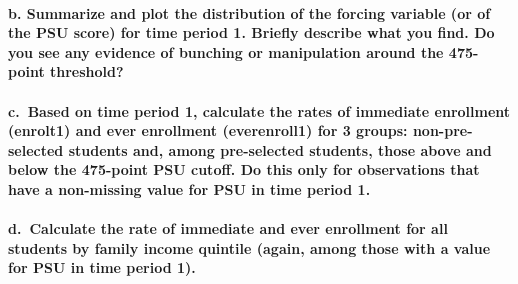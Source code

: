 \documentclass[
]{article}
\begin{document}
\paragraph{b. Summarize and plot the distribution of the forcing
variable (or of the PSU score) for time period 1. Briefly describe what
you find. Do you see any evidence of bunching or manipulation around the
475-point
threshold?}\label{b.-summarize-and-plot-the-distribution-of-the-forcing-variable-or-of-the-psu-score-for-time-period-1.-briefly-describe-what-you-find.-do-you-see-any-evidence-of-bunching-or-manipulation-around-the-475-point-threshold}

\paragraph{c.~Based on time period 1, calculate the rates of immediate
enrollment (enrolt1) and ever enrollment (everenroll1) for 3 groups:
non-pre-selected students and, among pre-selected students, those above
and below the 475-point PSU cutoff. Do this only for observations that
have a non-missing value for PSU in time period
1.}\label{c.-based-on-time-period-1-calculate-the-rates-of-immediate-enrollment-enrolt1-and-ever-enrollment-everenroll1-for-3-groups-non-pre-selected-students-and-among-pre-selected-students-those-above-and-below-the-475-point-psu-cutoff.-do-this-only-for-observations-that-have-a-non-missing-value-for-psu-in-time-period-1.}

\paragraph{d.~Calculate the rate of immediate and ever enrollment for
all students by family income quintile (again, among those with a value
for PSU in time period
1).}\label{d.-calculate-the-rate-of-immediate-and-ever-enrollment-for-all-students-by-family-income-quintile-again-among-those-with-a-value-for-psu-in-time-period-1.}
\end{document}
